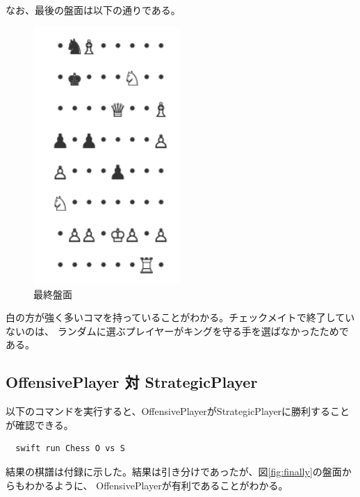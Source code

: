 \documentclass[12pt, a4paper, uplatex]{jsarticle}
\begin{document}
なお、最後の盤面は以下の通りである。
\begin{figure}
  [h]
  \centering
  \includegraphics[width=0.5\textwidth]{LastChessboard.png}
  \caption{最終盤面}\label{fig:final}
\end{figure}
白の方が強く多いコマを持っていることがわかる。チェックメイトで終了していないのは、
ランダムに選ぶプレイヤーがキングを守る手を選ばなかったためである。

\subsection{OffensivePlayer 対 StrategicPlayer}
以下のコマンドを実行すると、OffensivePlayerがStrategicPlayerに勝利することが確認できる。
\begin{verbatim}
  swift run Chess O vs S
\end{verbatim}

結果の棋譜は付録に示した。結果は引き分けであったが、図\ref{fig:finally}の盤面からもわかるように、
OffensivePlayerが有利であることがわかる。
\end{document}
